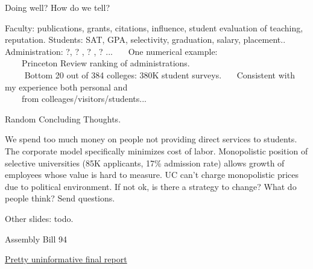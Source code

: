 \documentclass[hyperref={colorlinks}]{beamer}
\newcommand{\skippause}{\vskip5pt
\pause}
\begin{document}
\begin{frame}{Doing well? How do we tell?}

Faculty: publications, grants, citations, influence, 
{\color{blue} student evaluation of teaching}, reputation. 
\skippause
Students: SAT, GPA, selectivity, graduation, salary, placement..
\skippause
Administration: {\color{red} ?, ? , ? , ? ...}
\skippause
~~~One numerical example: \\
~~~~Princeton Review ranking of administrations. \\
~~~~{\color{red} Bottom 20 out of 384 colleges: 380K student surveys.}
\skippause
~~~Consistent with my experience both personal and  \\
~~~~from colleages/visitors/students...

\end{frame}





\begin{frame}{Random Concluding Thoughts.}

We spend too much money on people
not providing direct services to students.
\skippause
The corporate model specifically minimizes cost of labor. 
\skippause
Monopolistic position of selective universities (85K applicants, 17\%
admission rate) allows growth of employees whose value is hard to
measure.
\skippause
UC can't charge monopolistic prices due to political environment.
\skippause
If not ok, is there a strategy to change?
\skippause
What do people think?  Send questions.


\end{frame}


\begin{frame}{Other slides: todo.}

\end{frame}

\begin{frame}{Assembly Bill 94}

\href{http://www.ucop.edu/operating-budget/_files/legreports/14-15/efifinallegrpt-2-17-15.pdf}{Pretty uninformative final report}

\end{frame}
\end{document}
